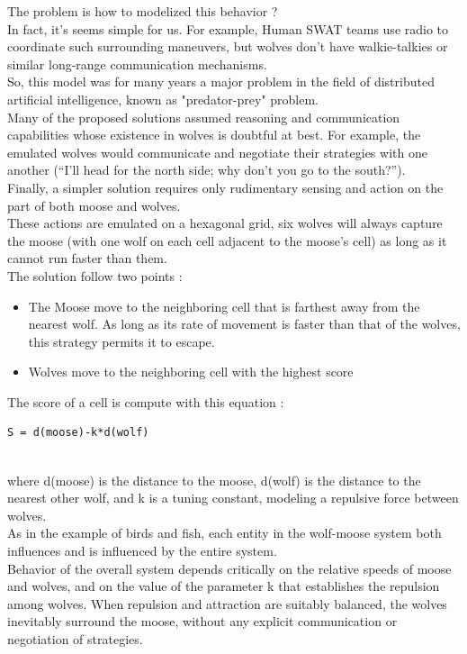 The problem is how to modelized this behavior ?\\
In fact, it's seems simple for us. For example, Human SWAT teams use radio to coordinate such surrounding maneuvers, but wolves don’t have walkie-talkies or similar long-range communication mechanisms.\\

So, this model was for many years a major problem in the field of distributed artificial intelligence, known as "predator-prey" problem.\\

Many of the proposed solutions assumed reasoning and communication capabilities whose existence in wolves is doubtful at best. For example, the emulated wolves would communicate and negotiate their strategies with one another (“I’ll head for the north side; why don’t you go to the south?”).\\
Finally, a simpler solution requires only rudimentary sensing and action on the part of both moose and wolves.\\
These actions are emulated on a hexagonal grid, six wolves will always capture the moose (with one wolf on each cell adjacent to the moose’s cell) as long as it cannot run faster than them.\\

The solution follow two points :
\begin{itemize}
\item The Moose move to the neighboring cell that is farthest away from the nearest wolf. As long as its rate of movement is faster than that of the wolves, this strategy permits it to escape.
\item Wolves move to the neighboring cell with the highest score
\end{itemize}

The score of a cell is compute with this equation :
\begin{lstlisting}[frame=trBL, title=Score calculation]
			S = d(moose)-k*d(wolf)
\end{lstlisting}
~\\
where d(moose) is the distance to the moose, d(wolf) is the distance to the nearest other wolf, and k is a
tuning constant, modeling a repulsive force between wolves.\\

As in the example of birds and fish, each entity in the wolf-moose system both influences and is influenced by the entire system.\\
Behavior of the overall system depends critically on the relative speeds of moose and wolves, and on the value of the parameter k that establishes the repulsion among wolves. When repulsion and attraction are suitably balanced, the wolves inevitably surround the moose, without any explicit communication or negotiation of strategies.
